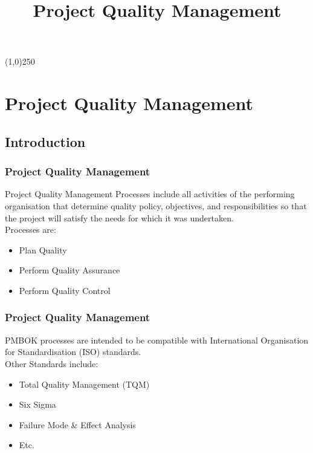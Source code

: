 




\title[Project Management]{Project Quality Management}



%
\usetikzlibrary{arrows}

\tableofcontents
\newpage



\begin{frame}
\titlepage
\end{frame}\begin{center}\line(1,0){250}\end{center}
%
%








\section{Project Quality Management}

\subsection{Introduction}

\begin{frame}
\frametitle{Project Quality Management}
Project Quality Management Processes include all activities of the performing organisation that determine quality policy, objectives, and responsibilities so that the project will satisfy the needs for which it was undertaken.\\
Processes are:\\
\begin{itemize}
	\item Plan Quality
	\item Perform Quality Assurance
	\item Perform Quality Control
\end{itemize}
\end{frame}




\begin{frame}
\frametitle{Project Quality Management}
PMBOK processes are intended to be compatible with International Organisation for Standardisation (ISO) standards.\\
Other Standards include:\\
\begin{itemize}
	\item Total Quality Management (TQM)
	\item Six Sigma
	\item Failure Mode \& Effect Analysis
	\item Etc.
\end{itemize}
\end{frame}





